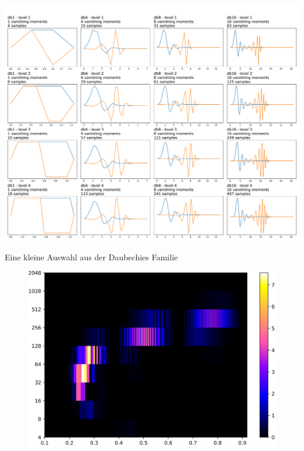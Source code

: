 \begin{table}
\includegraphics[width=\linewidth]{papers/autotune/sections/frequenzanalyse/images/DaubechiesFamilie.pdf}
\caption{Eine kleine Auswahl aus der Daubechies Familie}
\label{tab:Daubechies}
\end{table}

\begin{figure}
\centering
\includegraphics[width=\linewidth]{papers/autotune/sections/frequenzanalyse/images/sweepdwt-clipped.jpg}
\label{fig:sin-sweep}
\end{figure}%

